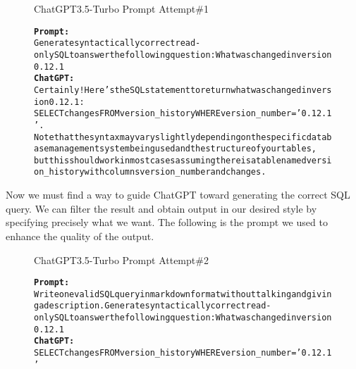 \begin{figure}[H]
    \begin{AIbox}{ChatGPT3.5-Turbo Prompt Attempt\#1}
        \vspace{-5px}
        \parbox{1\textwidth}{\scriptsize
        \begin{alltt} 
            {\bf Prompt:} \\ 
            Generate syntactically correct read-only SQL to answer the following question: What was changed in version 0.12.1
            \\
            {\bf ChatGPT:} \\
            Certainly! Here's the SQL statement to return what was changed in version 0.12.1:\\
            SELECT changes FROM version\_history WHERE version\_number = '0.12.1'. \\ Note that the syntax may vary slightly depending on the specific database management system being used and the structure of your tables,\\ but this should work in most cases assuming there is a table named version\_history with columns version\_number and changes.
        \end{alltt}
        }
        \vspace{-5px}
    \end{AIbox}
\end{figure}

Now we must find a way to guide ChatGPT toward generating the correct SQL query. We can filter the result and obtain output in our desired style by specifying precisely what we want. The following is the prompt we used to enhance the quality of the output.

\begin{figure}[H]
    \begin{AIbox}{ChatGPT3.5-Turbo Prompt Attempt\#2}
        \vspace{-5px}
        \parbox{1\textwidth}{\scriptsize
        \begin{alltt} 
            {\bf Prompt:} \\ 
            Write one valid SQL query in markdown format without talking and giving a description. Generate syntactically correct read-only SQL to answer the following question: What was changed in version 0.12.1
            \\
            {\bf ChatGPT:} \\
            SELECT changes FROM version\_history WHERE version\_number = '0.12.1'
        \end{alltt}
        }
        \vspace{-5px}
    \end{AIbox}
\end{figure}

